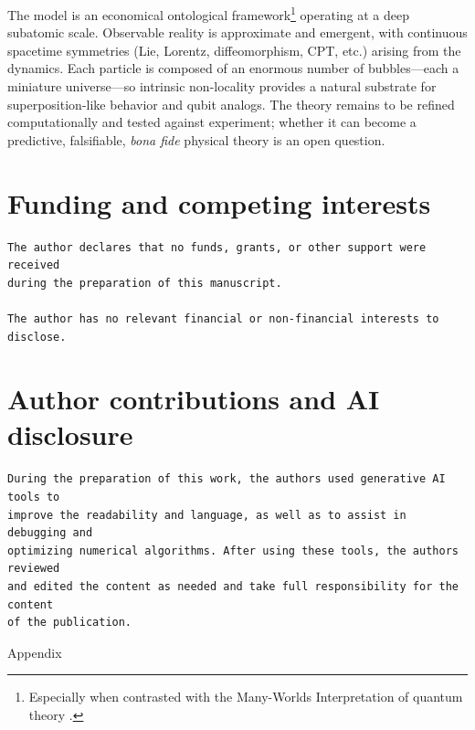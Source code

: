 \documentclass{ijuc}
\begin{document}
The model is an economical ontological framework\footnote{Especially when contrasted with the Many-Worlds Interpretation of quantum theory \cite{everett1957}.} operating at a deep subatomic scale. Observable reality is approximate and emergent, with continuous spacetime symmetries (Lie, Lorentz, diffeomorphism, CPT, etc.) arising from the dynamics. Each particle is composed of an enormous number of bubbles—each a miniature universe—so intrinsic non-locality provides a natural substrate for superposition-like behavior and qubit analogs. The theory remains to be refined computationally and tested against experiment; whether it can become a predictive, falsifiable, \emph{bona fide} physical theory is an open question.


\section*{Funding and competing interests}
\begin{verbatim}
The author declares that no funds, grants, or other support were received 
during the preparation of this manuscript.

The author has no relevant financial or non-financial interests to disclose.
\end{verbatim}

\section*{Author contributions and AI disclosure}
\begin{verbatim}
During the preparation of this work, the authors used generative AI tools to
improve the readability and language, as well as to assist in debugging and
optimizing numerical algorithms. After using these tools, the authors reviewed
and edited the content as needed and take full responsibility for the content
of the publication.
\end{verbatim}

\printbibliography

% 
% 


\newpage{}


\appendix
\begin{center}
{\LARGE{}Appendix}{\LARGE\par}
\par\end{center}
\end{document}
